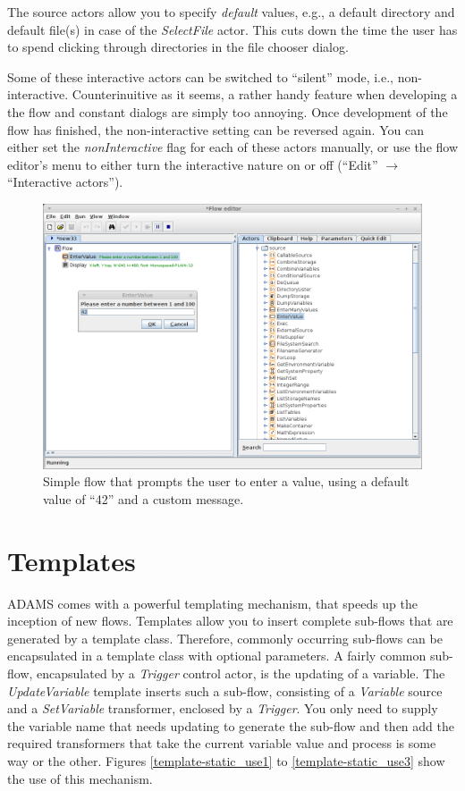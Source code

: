 The source actors allow you to specify \textit{default} values, e.g., a
default directory and default file(s) in case of the \textit{SelectFile} actor.
This cuts down the time the user has to spend clicking through directories in
the file chooser dialog.

Some of these interactive actors can be switched to ``silent'' mode, i.e.,
non-interactive. Counterinuitive as it seems, a rather handy feature when
developing a the flow and constant dialogs are simply too annoying. Once
development of the flow has finished, the non-interactive setting can be
reversed again. You can either set the \textit{nonInteractive} flag for each of
these actors manually, or use the flow editor's menu to either turn the
interactive nature on or off (``Edit'' $\rightarrow$ ``Interactive actors'').

\begin{figure}[htb]
  \centering
  \includegraphics[width=12.0cm]{images/floweditor-interactive_actors1.png}
  \caption{Simple flow that prompts the user to enter a value, using a default
  value of ``42'' and a custom message.}
  \label{floweditor-interactive_actors1}
\end{figure}

\newpage
\section{Templates}
\label{templates}
ADAMS comes with a powerful templating mechanism, that speeds up the
inception of new flows. Templates allow you to insert complete sub-flows
that are generated by a template class. Therefore, commonly occurring sub-flows
can be encapsulated in a template class with optional parameters. A fairly
common sub-flow, encapsulated by a \textit{Trigger} control actor, is the
updating of a variable. The \textit{UpdateVariable} template inserts such a
sub-flow, consisting of a \textit{Variable} source and a \textit{SetVariable}
transformer, enclosed by a \textit{Trigger}. You only need to supply the
variable name that needs updating to generate the sub-flow and then add the
required transformers that take the current variable value and process is some
way or the other. Figures \ref{template-static_use1} to
\ref{template-static_use3} show the use of this mechanism.

